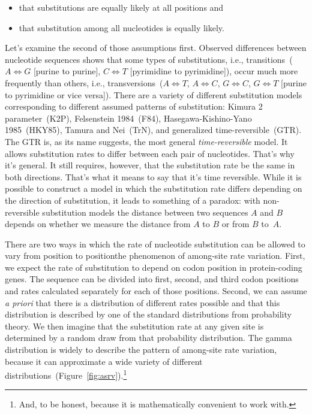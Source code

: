 \begin{itemize}

\item that substitutions are equally likely at all positions and

\item that substitution among all nucleotides is equally likely.

\end{itemize}

Let's examine the second of those assumptions first. Observed
differences between nucleotide sequences shows that some types of
substitutions, i.e., transitions~($A \iff G$ [purine to purine], $C
\iff T$ [pyrimidine to pyrimidine]), occur much more frequently than
others, i.e., transversions~($A \iff T$, $A \iff C$, $G \iff C$, $G
\iff T$ [purine to pyrimidine or vice versa]). There are a variety of
different substitution models corresponding to different assumed
patterns of substitution: Kimura 2 parameter~(K2P), Felsenstein
1984~(F84), Hasegawa-Kishino-Yano 1985~(HKY85), Tamura and Nei~(TrN),
and generalized time-reversible~(GTR). The GTR is, as its name
suggests, the most general {\it time-reversible\/} model. It allows
substitution rates to differ between each pair of nucleotides. That's
why it's general. It still requires, however, that the substitution
rate be the same in both directions. That's what it means to say that
it's time reversible. While it is possible to construct a model in
which the substitution rate differs depending on the direction of
substitution, it leads to something of a paradox: with non-reversible
substitution models the distance between two sequences $A$ and $B$
depends on whether we measure the distance from $A$ to $B$ or from $B$
to~$A$.

There are two ways in which the rate of nucleotide substitution can be
allowed to vary from position to position{\dash}the phenomenon of
among-site rate variation. First, we expect the rate of substitution
to depend on codon position in protein-coding genes. The sequence can
be divided into first, second, and third codon positions and rates
calculated separately for each of those positions. Second, we can
assume {\it a priori\/} that there is a distribution of different
rates possible and that this distribution is described by one of the
standard distributions from probability theory. We then imagine that
the substitution rate at any given site is determined by a random draw
from that probability distribution. The gamma distribution is widely
to describe the pattern of among-site rate variation, because it can
approximate a wide variety of different
distributions~(Figure~\ref{fig:asrv}).\footnote{And, to be honest,
  because it is mathematically convenient to work
  with.}


